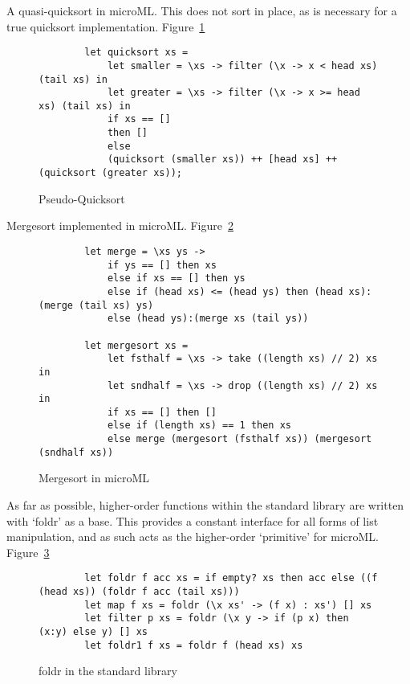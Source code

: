 A quasi-quicksort in microML\@. This does not sort in place, as is necessary for a true quicksort
implementation. Figure~\ref{fig:quicksort}

\begin{figure}[H]
    \begin{verbatim}
        let quicksort xs = 
            let smaller = \xs -> filter (\x -> x < head xs) (tail xs) in
            let greater = \xs -> filter (\x -> x >= head xs) (tail xs) in
            if xs == [] 
            then [] 
            else
            (quicksort (smaller xs)) ++ [head xs] ++ (quicksort (greater xs));
    \end{verbatim}
    \caption{Pseudo-Quicksort}
\label{fig:quicksort}
\end{figure}

Mergesort implemented in microML\@. Figure~\ref{fig:mergesort}

\begin{figure}[H]
    \begin{verbatim}
        let merge = \xs ys ->  
            if ys == [] then xs
            else if xs == [] then ys
            else if (head xs) <= (head ys) then (head xs):(merge (tail xs) ys)
            else (head ys):(merge xs (tail ys)) 

        let mergesort xs =
            let fsthalf = \xs -> take ((length xs) // 2) xs in 
            let sndhalf = \xs -> drop ((length xs) // 2) xs in
            if xs == [] then []
            else if (length xs) == 1 then xs
            else merge (mergesort (fsthalf xs)) (mergesort (sndhalf xs))
    \end{verbatim}
    \caption{Mergesort in microML}
\label{fig:mergesort}
\end{figure}

As far as possible, higher-order functions within the standard library are written with `foldr' as a
base. This provides a constant interface for all forms of list manipulation, and as such acts as the
higher-order `primitive' for microML\@. Figure~\ref{fig:foldr}

\begin{figure}[H]
    \begin{verbatim}
        let foldr f acc xs = if empty? xs then acc else ((f (head xs)) (foldr f acc (tail xs)))
        let map f xs = foldr (\x xs' -> (f x) : xs') [] xs
        let filter p xs = foldr (\x y -> if (p x) then (x:y) else y) [] xs
        let foldr1 f xs = foldr f (head xs) xs
    \end{verbatim}
    \caption{foldr in the standard library}
\label{fig:foldr}
\end{figure}


